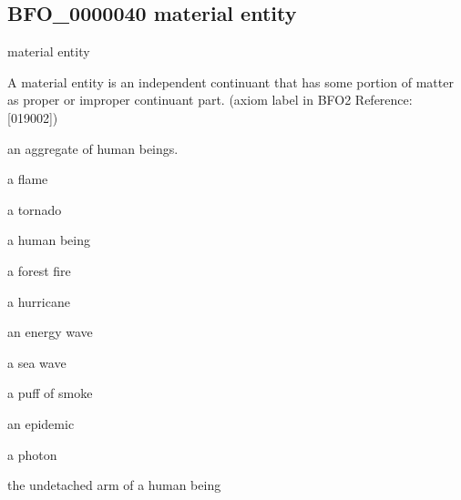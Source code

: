 \documentclass[letterpaper,10pt,english]{sphinxmanual}
\begin{document}
\begin{sphinxShadowBox}

\sphinxAtStartPar
{}
\end{sphinxShadowBox}
\begin{quote}

\ignorespaces \end{quote}


\subsection{BFO\_0000040 \sphinxhyphen{} material entity}
\label{\detokenize{doc-BFO_0000040:bfo-0000040-material-entity}}\label{\detokenize{doc-BFO_0000040:index-0}}\label{\detokenize{doc-BFO_0000040::doc}}
\begin{sphinxShadowBox}

\sphinxAtStartPar
material entity
\end{sphinxShadowBox}

\begin{sphinxShadowBox}

\sphinxAtStartPar
{\hyperref[\detokenize{doc-BFO_0000004::doc}]{}}
\end{sphinxShadowBox}

\begin{sphinxShadowBox}

\sphinxAtStartPar
A material entity is an independent continuant that has some portion of matter as proper or improper continuant part. (axiom label in BFO2 Reference: {[}019\sphinxhyphen{}002{]})
\end{sphinxShadowBox}

\begin{sphinxShadowBox}

\sphinxAtStartPar
an aggregate of human beings.

\sphinxAtStartPar
a flame

\sphinxAtStartPar
a tornado

\sphinxAtStartPar
a human being

\sphinxAtStartPar
a forest fire

\sphinxAtStartPar
a hurricane

\sphinxAtStartPar
an energy wave

\sphinxAtStartPar
a sea wave

\sphinxAtStartPar
a puff of smoke

\sphinxAtStartPar
an epidemic

\sphinxAtStartPar
a photon

\sphinxAtStartPar
the undetached arm of a human being
\end{sphinxShadowBox}
\end{document}
